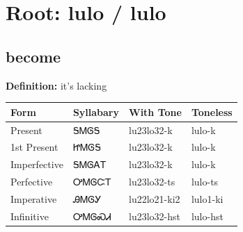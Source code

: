 \documentclass{article}%
\begin{document}
%
\normalsize%
\section*{Root: lulo / lulo}%
\subsection*{become}%
\textbf{Definition: }%
it’s lacking%
\\[0.5em]%
\begin{tabular}{|l|l|l|l|}%
\hline%
\textbf{Form}&\textbf{Syllabary}&\textbf{With Tone}&\textbf{Toneless}\\%
\hline%
Present&ᎦᎷᎶᎦ&lu23lo32{-}k&lulo{-}k\\%
1st Present&ᏥᎷᎶᎦ&lu23lo32{-}k&lulo{-}k\\%
Imperfective&ᎦᎷᎶᎪᎢ&lu23lo32{-}k&lulo{-}k\\%
Perfective&ᎤᎷᎶᏨᎢ&lu23lo32{-}ts&lulo{-}ts\\%
Imperative&ᎯᎷᎶᎩ&lu22lo21{-}ki2&lulo1{-}ki\\%
Infinitive&ᎤᎷᎶᏍᏗ&lu23lo32{-}hst&lulo{-}hst\\%
\hline%
\end{tabular}%
\\[1em]%
\end{document}
